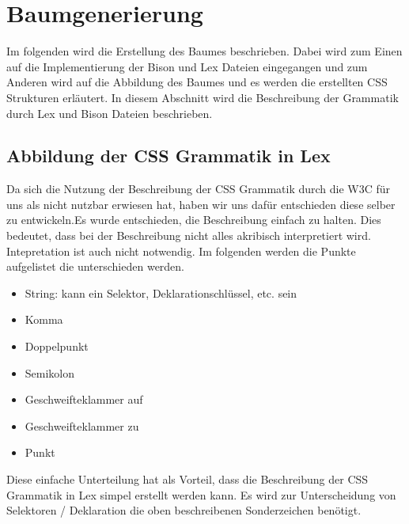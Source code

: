 \section{Baumgenerierung}
Im folgenden wird die Erstellung des Baumes beschrieben. Dabei wird zum Einen auf die Implementierung der Bison und Lex Dateien eingegangen und zum Anderen wird auf die Abbildung des Baumes und es werden die erstellten CSS Strukturen erläutert.
In diesem Abschnitt wird die Beschreibung der Grammatik durch Lex und Bison Dateien beschrieben. 
\subsection{Abbildung der CSS Grammatik in Lex}
\label{tree_generation_lex}
Da sich die Nutzung der Beschreibung der CSS Grammatik durch die W3C für uns als nicht nutzbar erwiesen hat, haben wir uns dafür entschieden diese selber zu entwickeln.Es wurde entschieden, die Beschreibung einfach zu halten. Dies bedeutet, dass bei der Beschreibung nicht alles akribisch interpretiert wird. Intepretation ist auch nicht notwendig. Im folgenden werden die Punkte aufgelistet die unterschieden werden. 
\begin{itemize}
\item{String: kann ein Selektor, Deklarationschlüssel, etc. sein} 
\item{Komma} 
\item{Doppelpunkt} 
\item{Semikolon} 
\item{Geschweifteklammer auf} 
\item{Geschweifteklammer zu} 
\item{Punkt} 
\end{itemize}
Diese einfache Unterteilung hat als Vorteil, dass die Beschreibung der CSS Grammatik in Lex simpel erstellt werden kann. Es wird zur Unterscheidung von Selektoren / Deklaration die oben beschreibenen Sonderzeichen benötigt. 
